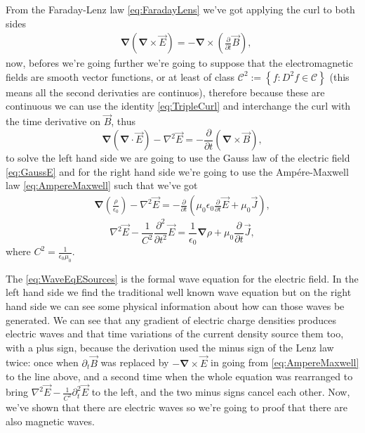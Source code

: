     From the Faraday-Lenz law \ref{eq:FaradayLens} we've got applying the curl to both sides
    \begin{align*}
        & \bm{\nabla}\left(\bm{\nabla} \times \vec{E} \right) = -\bm{\nabla} \times \left(\frac{\partial}{\partial t}\vec{B} \right),
    \end{align*}
    now, befores we're going further we're going to suppose that the electromagnetic fields are smooth vector functions, or at least of class $\mathcal{C}^2 := \left\{ f : D^2f \in \mathcal{C} \right\}$ (this means all the second derivaties are continuos), therefore because these are continuous we can use the identity \ref{eq:TripleCurl} and interchange the curl with the time derivative on $\vec{B}$, thus
    \begin{equation*}
        \bm{\nabla}\left(\bm{\nabla} \cdot \vec{E} \right) - \nabla^2 \vec{E} = - \frac{\partial}{\partial t} \left(\bm{\nabla} \times \vec{B} \right),
    \end{equation*}
    to solve the left hand side we are going to use the Gauss law of the electric field \ref{eq:GaussE} and for the right hand side we're going to use the Ampére-Maxwell law \ref{eq:AmpereMaxwell} such that we've got
    \begin{align*}
        \bm{\nabla}\left(\frac{\rho}{\epsilon_0} \right) - \nabla^2 \vec{E} = -\frac{\partial}{\partial t}\left(\mu_0\epsilon_0 \frac{\partial}{\partial t}\vec{E} + \mu_0 \vec{J}  \right),
    \end{align*}
    \begin{equation}\label{eq:WaveEqESources}
        \nabla^2\vec{E} - \frac{1}{C^2}\frac{\partial^2}{\partial t^2}\vec{E} = \frac{1}{\epsilon_0}\bm{\nabla}\rho + \mu_0 \frac{\partial}{\partial t}\vec{J},
    \end{equation}
    where $C^2 = \frac{1}{\epsilon_0 \mu_0}$.

    The \ref{eq:WaveEqESources} is the formal wave equation for the electric field. In the left hand side we find the traditional well known wave equation but on the right hand side we can see some physical information about how can those waves be generated. We can see that any gradient of electric charge densities produces electric waves and that time variations of the current density source them too, with a plus sign, because the derivation used the minus sign of the Lenz law twice: once when $\partial_t\vec{B}$ was replaced by $-\bm{\nabla}\times\vec{E}$ in going from \ref{eq:AmpereMaxwell} to the line above, and a second time when the whole equation was rearranged to bring $\nabla^2\vec{E} - \frac{1}{C^2}\partial_t^2\vec{E}$ to the left, and the two minus signs cancel each other. Now, we've shown that there are electric waves so we're going to proof that there are also magnetic waves.

